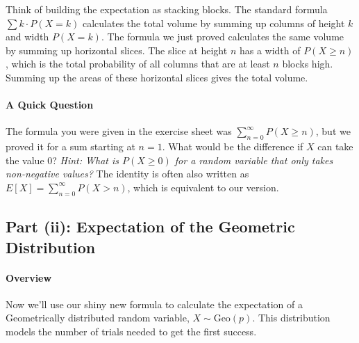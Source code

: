 \documentclass[11pt,a4paper]{article}
\begin{document}
Think of building the expectation as stacking blocks. The standard formula $\sum k \cdot P(X=k)$ calculates the total volume by summing up columns of height $k$ and width $P(X=k)$. The formula we just proved calculates the same volume by summing up horizontal slices. The slice at height $n$ has a width of $P(X \ge n)$, which is the total probability of all columns that are at least $n$ blocks high. Summing up the areas of these horizontal slices gives the total volume.

\paragraph{A Quick Question}
The formula you were given in the exercise sheet was $\sum_{n=0}^{\infty} P(X \ge n)$, but we proved it for a sum starting at $n=1$. What would be the difference if $X$ can take the value 0?
\textit{Hint: What is $P(X \ge 0)$ for a random variable that only takes non-negative values?} The identity is often also written as $E[X] = \sum_{n=0}^\infty P(X > n)$, which is equivalent to our version.

\subsection{Part (ii): Expectation of the Geometric Distribution}

\paragraph{Overview}
Now we'll use our shiny new formula to calculate the expectation of a Geometrically distributed random variable, $X \sim \text{Geo}(p)$. This distribution models the number of trials needed to get the first success.
\end{document}
